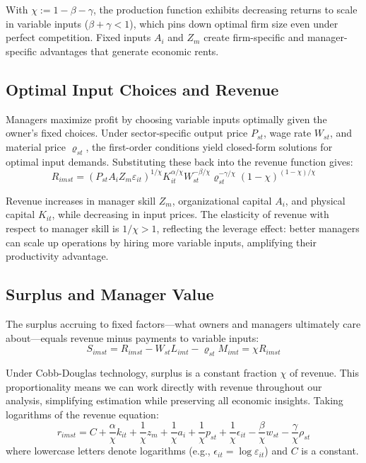 \documentclass[11pt,a4paper]{article}
\begin{document}
With $\chi := 1 - \beta - \gamma$, the production function exhibits decreasing returns to scale in variable inputs ($\beta + \gamma < 1$), which pins down optimal firm size even under perfect competition. Fixed inputs $A_i$ and $Z_m$ create firm-specific and manager-specific advantages that generate economic rents.

\subsection{Optimal Input Choices and Revenue}

Managers maximize profit by choosing variable inputs optimally given the owner's fixed choices. Under sector-specific output price $P_{st}$, wage rate $W_{st}$, and material price $\varrho_{st}$, the first-order conditions yield closed-form solutions for optimal input demands. Substituting these back into the revenue function gives:
\begin{equation}\label{eq:revenue}
R_{imst} = (P_{st}A_i Z_m \varepsilon_{it})^{1/\chi}
K_{it}^{\alpha/\chi}
W_{st}^{-\beta/\chi}
\varrho_{st}^{-\gamma/\chi}
(1-\chi)^{(1-\chi)/\chi}
\end{equation}

Revenue increases in manager skill $Z_m$, organizational capital $A_i$, and physical capital $K_{it}$, while decreasing in input prices. The elasticity of revenue with respect to manager skill is $1/\chi > 1$, reflecting the leverage effect: better managers can scale up operations by hiring more variable inputs, amplifying their productivity advantage.

\subsection{Surplus and Manager Value}

The surplus accruing to fixed factors—what owners and managers ultimately care about—equals revenue minus payments to variable inputs:
\begin{equation}\label{eq:surplus}
S_{imst} = R_{imst} - W_{st}L_{imt} - \varrho_{st}M_{imt} = \chi R_{imst}
\end{equation}

Under Cobb-Douglas technology, surplus is a constant fraction $\chi$ of revenue. This proportionality means we can work directly with revenue throughout our analysis, simplifying estimation while preserving all economic insights. Taking logarithms of the revenue equation:
\begin{equation}\label{eq:log_revenue}
r_{imst} = C+\frac{\alpha}{\chi} k_{it} + \frac{1}{\chi} z_{m} + \frac{1}{\chi} a_i + \frac{1}{\chi} p_{st} + \frac{1}{\chi}\epsilon_{it} 
- \frac{\beta}{\chi} w_{st} - \frac{\gamma}{\chi} \rho_{st}
\end{equation}
where lowercase letters denote logarithms (e.g., $\epsilon_{it} = \log \varepsilon_{it}$) and $C$ is a constant.
\end{document}
